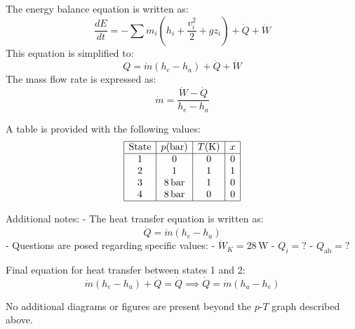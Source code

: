 The energy balance equation is written as:  
\[
\frac{dE}{dt} = -\sum \dot{m}_i (h_i + \frac{v_i^2}{2} + g z_i) + \dot{Q} + \dot{W}
\]  
This equation is simplified to:  
\[
Q = \dot{m} (h_e - h_a) + \dot{Q} + \dot{W}
\]  
The mass flow rate is expressed as:  
\[
\dot{m} = \frac{\dot{W} - \dot{Q}}{h_e - h_a}
\]  

A table is provided with the following values:  
\[
\begin{array}{|c|c|c|c|}
\hline
\text{State} & p (\text{bar}) & T (\text{K}) & x \\
\hline
1 & 0 & 0 & 0 \\
2 & 1 & 1 & 1 \\
3 & 8 \, \text{bar} & 1 & 0 \\
4 & 8 \, \text{bar} & 0 & 0 \\
\hline
\end{array}
\]  

Additional notes:  
- The heat transfer equation is written as:  
\[
\dot{Q} = \dot{m} (h_e - h_a)
\]  
- Questions are posed regarding specific values:  
  - \( \dot{W}_K = 28 \, \text{W} \)  
  - \( Q_i = ? \)  
  - \( Q_{\text{ab}} = ? \)  

Final equation for heat transfer between states 1 and 2:  
\[
\dot{m} (h_e - h_a) + \dot{Q} = \dot{Q} \implies \dot{Q} = \dot{m} (h_a - h_e)
\]  

No additional diagrams or figures are present beyond the \( p \)-\( T \) graph described above.